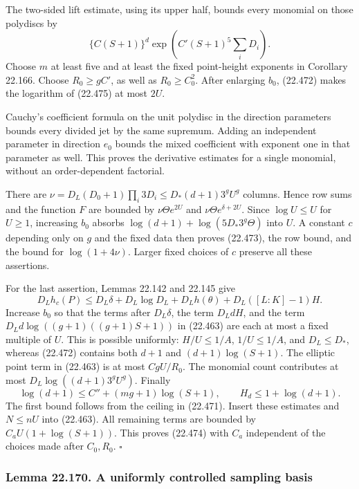 \documentclass[
  11pt,
  a4paper,
]{article}
\begin{document}
The two-sided lift estimate, using its upper half, bounds every monomial
on those polydiscs by \[
 \{C(S+1)\}^{d}
       \exp\left(C'(S+1)^5\sum_iD_i\right).
 \tag{22.475}
\] Choose \(m\) at least five and at least the fixed point-height
exponents in Corollary 22.166. Choose \(R_0\ge gC'\), as well as
\(R_0\ge C_0^2\). After enlarging \(b_0\), (22.472) makes the logarithm
of (22.475) at most \(2U\).

Cauchy's coefficient formula on the unit polydisc in the direction
parameters bounds every divided jet by the same supremum. Adding an
independent parameter in direction \(e_0\) bounds the mixed coefficient
with exponent one in that parameter as well. This proves the derivative
estimates for a single monomial, without an order-dependent factorial.

There are \(\nu=D_L(D_0+1)\prod_i3D_i
\le D_*(d+1)3^gU^g\) columns. Hence row sums and the function \(F\) are
bounded by \(\nu\Theta e^{2U}\) and \(\nu\Theta e^{\delta+2U}\). Since
\(\log U\le U\) for \(U\ge1\), increasing \(b_0\) absorbs
\(\log(d+1)+\log(5D_*3^g\Theta)\) into \(U\). A constant \(c\) depending
only on \(g\) and the fixed data then proves (22.473), the row bound,
and the bound for \(\log(1+4\nu)\). Larger fixed choices of \(c\)
preserve all these assertions.

For the last assertion, Lemmas 22.142 and 22.145 give \[
 D_L h_c(P)\le D_L\delta+
 D_L\log D_L+D_L h(\theta)+D_L([L:K]-1)H.
 \tag{22.476}
\] Increase \(b_0\) so that the terms after \(D_L\delta\), the term
\(D_L dH\), and the term \(D_L d\log((g+1)((g+1)S+1))\) in (22.463) are
each at most a fixed multiple of \(U\). This is possible uniformly:
\(H/U\le1/A\), \(1/U\le1/A\), and \(D_L\le D_*\), whereas (22.472)
contains both \(d+1\) and \((d+1)\log(S+1)\). The elliptic point term in
(22.463) is at most \(CgU/R_0\). The monomial count contributes at most
\(D_L\log((d+1)3^gU^g)\). Finally \[
 \log(d+1)\le C''+(mg+1)\log(S+1),\qquad
 H_d\le1+\log(d+1).
 \tag{22.477}
\] The first bound follows from the ceiling in (22.471). Insert these
estimates and \(N\le nU\) into (22.463). All remaining terms are bounded
by \(C_aU(1+\log(S+1))\). This proves (22.474) with \(C_a\) independent
of the choices made after \(C_0,R_0\). \(\square\)

\subsubsection{Lemma 22.170. A uniformly controlled sampling
basis}\label{lemma-22.170.-a-uniformly-controlled-sampling-basis}
\end{document}
